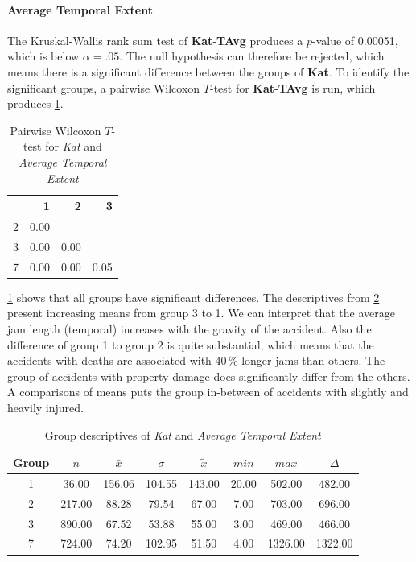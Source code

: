 \paragraph{Average Temporal Extent}
The Kruskal-Wallis rank sum test of \textbf{Kat}-\textbf{TAvg} produces a $p$-value of 0.00051, which is below $\alpha=.05$. The null hypothesis can therefore be rejected, which means there is a significant difference between the groups of \textbf{Kat}. To identify the significant groups, a pairwise Wilcoxon $T$-test for \textbf{Kat}-\textbf{TAvg} is run, which produces \cref{tbl:wilcoxon_baysis_matched_Kat_TAvg}.
\begin{table}[ht]
	\small
	\centering
	\begin{tabular}{rrrr}
	  	\toprule
	 	& 1 & 2 & 3 \\ 
	  	\midrule
		2 & 0.00 &  &  \\ 
	  	3 & 0.00 & 0.00 &  \\ 
	  	7 & 0.00 & 0.00 & 0.05 \\ 
	   	\bottomrule
	\end{tabular}
	\caption{Pairwise Wilcoxon $T$-test for \textit{Kat} and \textit{Average Temporal Extent}}
	\label{tbl:wilcoxon_baysis_matched_Kat_TAvg}
\end{table}
\cref{tbl:wilcoxon_baysis_matched_Kat_TAvg} shows that all groups have significant differences. The descriptives from \cref{tbl:descriptives_baysis_matched_Kat_TAvg} present increasing means from group 3 to 1.	We can interpret that the average jam length (temporal) increases with the gravity of the accident. Also the difference of group 1 to group 2 is quite substantial, which means that the accidents with deaths are associated with 40\,\% longer jams than others. The group of accidents with property damage does significantly differ from the others. A comparisons of means puts the group in-between of accidents with slightly and heavily injured.
\begin{table}[ht]
	\small
	\centering
	\begin{tabular}{c|c|c|c|c|c|c|c}
	  	\toprule
		Group & $n$ & $\bar{x}$ & $\sigma$ & $\tilde{x}$ & $min$ & $max$ & $\Delta$ \\ 
	  	\midrule
		1 &  36.00 & 156.06 & 104.55 & 143.00 & 20.00 & 502.00 & 482.00 \\ 
	  	2 & 217.00 & 88.28 & 79.54 & 67.00 & 7.00 & 703.00 & 696.00 \\ 
	  	3 & 890.00 & 67.52 & 53.88 & 55.00 & 3.00 & 469.00 & 466.00 \\ 
	  	7 & 724.00 & 74.20 & 102.95 & 51.50 & 4.00 & 1326.00 & 1322.00 \\ 
	   	\bottomrule
	\end{tabular}
	\caption{Group descriptives of \textit{Kat} and \textit{Average Temporal Extent}}
	\label{tbl:descriptives_baysis_matched_Kat_TAvg}
\end{table}

